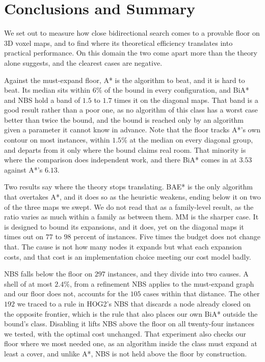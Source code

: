 \documentclass[letterpaper]{article} %
\begin{document}
\section{Conclusions and Summary}
We set out to measure how close bidirectional search comes to a provable floor on 3D voxel maps, and to find where its theoretical efficiency translates into practical performance. On this domain the two come apart more than the theory alone suggests, and the clearest cases are negative.

Against the must-expand floor, A* is the algorithm to beat, and it is hard to beat. Its median sits within $6\%$ of the bound in every configuration, and BiA* and NBS hold a band of $1.5$ to $1.7$ times it on the diagonal maps. That band is a good result rather than a poor one, as no algorithm of this class has a worst case better than twice the bound, and the bound is reached only by an algorithm given a parameter it cannot know in advance. Note that the floor tracks A*'s own contour on most instances, within $1.5\%$ at the median on every diagonal group, and departs from it only where the bound claims real room. That minority is where the comparison does independent work, and there BiA* comes in at $3.53$ against A*'s $6.13$.

Two results say where the theory stops translating. BAE* is the only algorithm that overtakes A*, and it does so as the heuristic weakens, ending below it on two of the three maps we swept. We do not read that as a family-level result, as the ratio varies as much within a family as between them. MM is the sharper case. It is designed to bound its expansions, and it does, yet on the diagonal maps it times out on $77$ to $98$ percent of instances. Five times the budget does not change that. The cause is not how many nodes it expands but what each expansion costs, and that cost is an implementation choice meeting our cost model badly.

NBS falls below the floor on $297$ instances, and they divide into two causes. A shell of at most $2.4\%$, from a refinement NBS applies to the must-expand graph and our floor does not, accounts for the $105$ cases within that distance. The other $192$ we traced to a rule in HOG2's NBS that discards a node already closed on the opposite frontier, which is the rule that also places our own BiA* outside the bound's class. Disabling it lifts NBS above the floor on all twenty-four instances we tested, with the optimal cost unchanged. That experiment also checks our floor where we most needed one, as an algorithm inside the class must expand at least a cover, and unlike A*, NBS is not held above the floor by construction.
\end{document}
